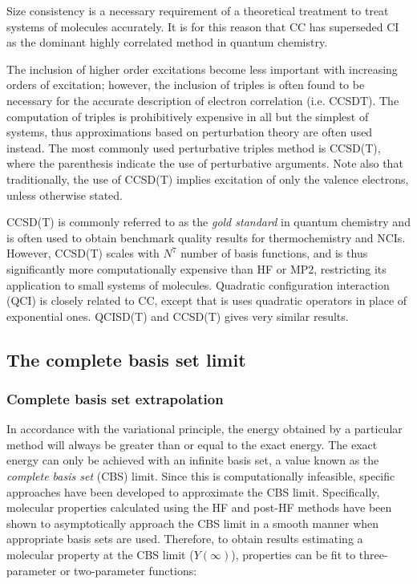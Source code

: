 \noindent Size consistency is a necessary requirement of a theoretical
treatment to treat systems of molecules accurately. It is for this reason that
CC has superseded CI as the dominant highly correlated method in quantum
chemistry.

The inclusion of higher order excitations become less important with increasing
orders of excitation; however, the inclusion of triples is often found to be
necessary for the accurate description of electron correlation (i.e. CCSDT). The
computation of triples is prohibitively expensive in all but the simplest of
systems, thus approximations based on perturbation theory are often used
instead. The most commonly used perturbative triples method is CCSD(T), where
the parenthesis indicate the use of perturbative arguments. Note also that
traditionally, the use of CCSD(T) implies excitation of only the valence
electrons, unless otherwise stated.

CCSD(T) is commonly referred to as the \emph{gold standard} in quantum chemistry
and is often used to obtain benchmark quality results for thermochemistry and
NCIs.\cite{Levine2013} However, CCSD(T) scales with $N^7$ number of basis
functions, and is thus significantly more computationally expensive than HF or
MP2, restricting its application to small systems of molecules. Quadratic
configuration interaction (QCI) is closely related to CC, except that is uses
quadratic operators in place of exponential ones. QCISD(T) and CCSD(T) gives
very similar results.\cite{Pople1987}

\subsection{The complete basis set limit}

\subsubsection{Complete basis set extrapolation}

In accordance with the variational principle, the energy obtained by a
particular method will always be greater than or equal to the exact energy. The
exact energy can only be achieved with an infinite basis set, a value known as
the \emph{complete basis set} (CBS) limit.\cite{Truhlar1998} Since this is
computationally infeasible, specific approaches have been developed to
approximate the CBS limit. Specifically, molecular properties calculated using
the HF and post-HF methods have been shown to asymptotically approach the CBS
limit in a smooth manner when appropriate basis sets are used. Therefore, to
obtain results estimating a molecular property at the CBS limit ($Y(\infty)$),
properties can be fit to three-parameter\cite{Feller1992,Feller1993} or
two-parameter functions:\cite{Helgaker1997,Halkier1998}


